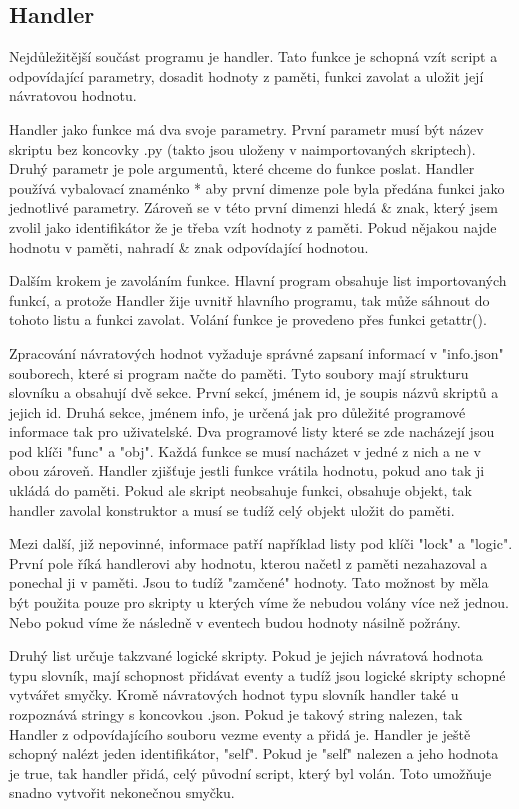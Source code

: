 \documentclass[12pt,a4paper]{article}
\begin{document}
\subsection{Handler}
Nejdůležitější součást programu je handler. Tato funkce je schopná vzít script a odpovídající parametry, dosadit hodnoty z paměti, funkci zavolat a uložit její návratovou hodnotu. 

Handler jako funkce má dva svoje parametry. První parametr musí být název skriptu bez koncovky .py (takto jsou uloženy v naimportovaných skriptech). Druhý parametr je pole argumentů, které chceme do funkce poslat. Handler používá vybalovací znaménko * aby první dimenze pole byla předána funkci jako jednotlivé parametry. Zároveň se v této první dimenzi hledá \& znak, který jsem zvolil jako identifikátor že je třeba vzít hodnoty z paměti. Pokud nějakou najde hodnotu v paměti, nahradí \& znak odpovídající hodnotou.

Dalším krokem je zavoláním funkce. Hlavní program obsahuje list importovaných funkcí, a protože Handler žije uvnitř hlavního programu, tak může sáhnout do tohoto listu a funkci zavolat. Volání funkce je provedeno přes funkci getattr().

Zpracování návratových hodnot vyžaduje správné zapsaní informací v "info.json" souborech, které si program načte do paměti. Tyto soubory mají strukturu slovníku a obsahují dvě sekce. První sekcí, jménem id, je soupis názvů skriptů a jejich id. Druhá sekce, jménem info, je určená jak pro důležité programové informace tak pro uživatelské. Dva programové listy které se zde nacházejí jsou pod klíči "func" a "obj". Každá funkce se musí nacházet v jedné z nich a ne v obou zároveň. Handler zjišťuje jestli funkce vrátila hodnotu, pokud ano tak ji ukládá do paměti. Pokud ale skript neobsahuje funkci, obsahuje objekt, tak handler zavolal konstruktor a musí se tudíž celý objekt uložit do paměti.

Mezi další, již nepovinné, informace patří například listy pod klíči "lock" a "logic". První pole říká handlerovi aby hodnotu, kterou načetl z paměti nezahazoval a ponechal ji v paměti. Jsou to tudíž "zamčené" hodnoty. Tato možnost by měla být použita pouze pro skripty u kterých víme že nebudou volány více než jednou. Nebo pokud víme že následně v eventech budou hodnoty násilně požrány. 

Druhý list určuje takzvané logické skripty. Pokud je jejich návratová hodnota typu slovník, mají schopnost přidávat eventy a tudíž jsou logické skripty schopné vytvářet smyčky. Kromě návratových hodnot typu slovník handler také u rozpoznává stringy s koncovkou .json. Pokud je takový string nalezen, tak Handler z odpovídajícího souboru vezme eventy a přidá je. Handler je ještě schopný nalézt jeden identifikátor, "self". Pokud je "self" nalezen a jeho hodnota je true, tak handler přidá, celý původní script, který byl volán. Toto umožňuje snadno vytvořit nekonečnou smyčku.
\end{document}
